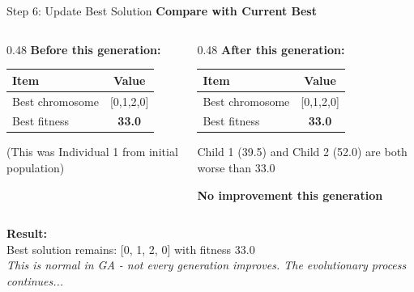 \documentclass[aspectratio=169,10pt]{beamer}
\begin{document}
\begin{frame}{Step 6: Update Best Solution}
  \colorbox{navymid}{\color{teallt}\bfseries Compare with Current Best}
  
  \vspace{0.3cm}
  \begin{columns}[T]
    \begin{column}{0.48\textwidth}
      \textbf{Before this generation:}
      
      \vspace{0.2cm}
      \begin{tabular}{lc}
        \toprule
        \rowcolor{navymid}
        \color{white}\textbf{Item} & \color{white}\textbf{Value} \\
        \midrule
        Best chromosome & [0,1,2,0] \\
        Best fitness & \textbf{33.0} \\
        \bottomrule
      \end{tabular}
      
      \vspace{0.3cm}
      {\small (This was Individual 1 from initial population)}
    \end{column}
    
    \begin{column}{0.48\textwidth}
      \textbf{After this generation:}
      
      \vspace{0.2cm}
      \begin{tabular}{lc}
        \toprule
        \rowcolor{navymid}
        \color{white}\textbf{Item} & \color{white}\textbf{Value} \\
        \midrule
        Best chromosome & [0,1,2,0] \\
        Best fitness & \textbf{33.0} \\
        \bottomrule
      \end{tabular}
      
      \vspace{0.3cm}
      {\small Child 1 (39.5) and Child 2 (52.0) are both worse than 33.0}
      
      \vspace{0.2cm}
      \colorbox{amber}{\color{white}\bfseries No improvement this generation}
    \end{column}
  \end{columns}
  
  \vspace{0.4cm}
  \colorbox{navymid}{\begin{minipage}{\linewidth}
    {\color{teallt}\small\bfseries Result:}\\
    {\color{white}\small Best solution remains: [0, 1, 2, 0] with fitness 33.0}\\
    {\color{teallt}\scriptsize\itshape This is normal in GA - not every generation improves. The evolutionary process continues...}
  \end{minipage}}
\end{frame}
\end{document}
